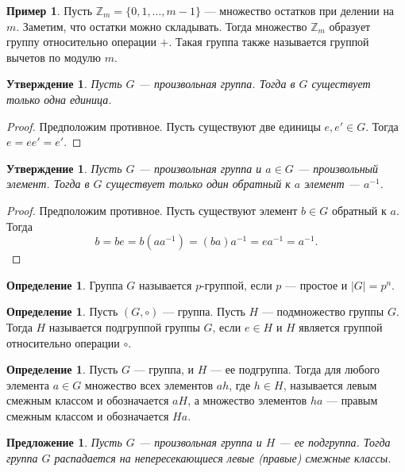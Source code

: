 \documentclass[12pt, titlepage, oneside]{amsbook}
\newcommand{\ZZ}{\mathbb{Z}}
\newtheorem{proposition}[theorem]{Предложение}
\newtheorem{claim}[theorem]{Утверждение}
\theoremstyle{definition}
\newtheorem{example}[theorem]{Пример}
\newtheorem{definition}[theorem]{Определение}
\theoremstyle{remark}
\begin{document}
\begin{example}
	Пусть $\ZZ_{m}=\{0,1,\dots,m-1\}$ --- множество остатков при делении
	на $m$. Заметим, что остатки можно складывать. Тогда множество
	$\ZZ_{m}$ образует группу относительно операции $+$. Такая группа
	также называется группой вычетов по модулю $m$.
\end{example}

\begin{claim}
	Пусть $G$ --- произвольная группа. Тогда в $G$ существует только
	одна единица.
\end{claim}

\begin{proof}
	Предположим противное. Пусть существуют две единицы $e,e'\in G$.
	Тогда $e=ee'=e'$.
\end{proof}

\begin{claim}
	Пусть $G$ --- произвольная группа и $a\in G$ --- произвольный
	элемент. Тогда в $G$ существует только один обратный к $a$ элемент
	--- $a^{-1}$.
\end{claim}

\begin{proof}
	Предположим противное. Пусть существуют элемент $b\in G$ обратный к
	$a$. Тогда $$b=be=b(aa^{-1})=(ba)a^{-1}=ea^{-1}=a^{-1}.$$
\end{proof}

\begin{definition}
	Группа $G$ называется $p$-группой, если $p$ --- простое и $|G|=p^n$.
\end{definition}

\begin{definition}
	Пусть $(G,\circ)$ --- группа. Пусть $H$ --- подмножество группы $G$.
	Тогда $H$ называется подгруппой группы $G$, если $e\in H$ и $H$
	является группой относительно операции $\circ$.
\end{definition}

\begin{definition}
	Пусть $G$ --- группа, и $H$ --- ее подгруппа. Тогда для любого
	элемента $a\in G$ множество всех элементов $ah$, где $h\in H$,
	называется левым смежным классом и обозначается $aH$, а множество
	элементов $ha$ --- правым смежным классом и обозначается $Ha$.
\end{definition}

\begin{proposition}
	\label{1.1Gr} Пусть $G$ --- произвольная группа и $H$ --- ее
	подгруппа. Тогда группа $G$ распадается на непересекающиеся левые
	(правые) смежные классы.
\end{proposition}
\end{document}
